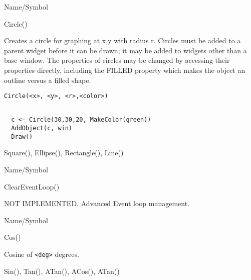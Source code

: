 \begin{desc}{Name/Symbol}
\item[Name/Symbol]	Circle()

\item[Description]	Creates a circle for graphing at x,y with radius
  r. Circles  must be added to a parent widget before it can be drawn; it may be added to
  widgets other than a base window. The properties of circles may be
  changed by accessing their properties directly, including the FILLED
  property which makes the object an outline versus a filled shape.


\item[Usage]
\begin{verbatim}
Circle(<x>, <y>, <r>,<color>)
\end{verbatim}

\item[Example]	
\begin{verbatim}
  
  c <- Circle(30,30,20, MakeColor(green))
  AddObject(c, win)
  Draw()

\end{verbatim}
\item[See Also]	Square(), Ellipse(), Rectangle(), Line()
\end{desc}

\rl



\begin{desc}{Name/Symbol}
\item[Name/Symbol]  	ClearEventLoop()

\item[Description]  	NOT IMPLEMENTED. Advanced Event loop management.

\item[Usage]		

\item[Example]	

\item[See Also]	
\end{desc}

\rl


\begin{desc}{Name/Symbol}
\item[Name/Symbol]  	Cos()
			 
\item[Description] 	Cosine of \verb+<deg>+ degrees.

\item[Usage]		

\item[Example]	

\item[See Also]     	Sin(), Tan(), ATan(), ACos(), ATan() 
\end{desc}

